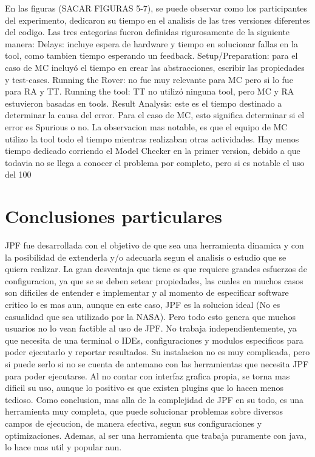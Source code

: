 \documentclass[runningheads]{llncs}
\begin{document}
En las figuras (SACAR FIGURAS 5-7), se puede observar como los participantes del experimento, dedicaron su tiempo en el analisis de las tres versiones diferentes del codigo. Las tres categorias fueron definidas rigurosamente de la siguiente manera:
Delays: incluye espera de hardware y tiempo en solucionar fallas en la tool, como tambien tiempo esperando un feedback.
Setup/Preparation: para el caso de MC incluyó el tiempo en crear las abstracciones, escribir las propiedades y test-cases.
Running the Rover: no fue muy relevante para MC pero si lo fue para RA y TT.
Running the tool: TT no utilizó ninguna tool, pero MC y RA estuvieron basadas en tools.
Result Analysis: este es el tiempo destinado a determinar la causa del error. Para el caso de MC, esto significa determinar si el error es Spurious o no.
La observacion mas notable, es que el equipo de MC utilizo la tool todo el tiempo mientras realizaban otras actividades. Hay menos tiempo dedicado corriendo el Model Checker en la primer version, debido a que todavia no se llega a conocer el problema por completo, pero si es notable el uso del 100%


\section{Conclusiones particulares}

JPF fue desarrollada con el objetivo de que sea una herramienta dinamica y con la posibilidad de extenderla y/o adecuarla segun el analisis o estudio que se quiera realizar. La gran desventaja que tiene es que requiere grandes esfuerzos de configuracion, ya que se se deben setear propiedades, las cuales en muchos casos son dificiles de entender e implementar y al momento de especificar software critico lo es mas aun, aunque en este caso, JPF es la solucion ideal (No es casualidad que sea utilizado por la NASA). Pero todo esto genera que muchos usuarios no lo vean factible al uso de JPF.
No trabaja independientemente, ya que necesita de una terminal o IDEs, configuraciones y modulos especificos para poder ejecutarlo y reportar resultados. Su instalacion no es muy complicada, pero si puede serlo si no se cuenta de antemano con las herramientas que necesita JPF para poder ejecutarse. Al no contar con interfaz grafica propia, se torna mas dificil su uso, aunque lo positivo es que existen plugins que lo hacen menos tedioso.
Como conclusion, mas alla de la complejidad de JPF en su todo, es una herramienta muy completa, que puede solucionar problemas sobre diversos campos de ejecucion, de manera efectiva, segun sus configuraciones y optimizaciones. Ademas, al ser una herramienta que trabaja puramente con java, lo hace mas util y popular aun.
\end{document}

